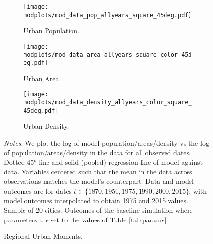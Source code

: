 \documentclass[./20250130-paper.tex]{subfiles}
\begin{document}
\begin{figure}[H]
	\begin{adjustbox}{center}
		\begin{subfigure}{\pthree\textwidth}
			\texttt{[image: \\modplots/mod\_data\_pop\_allyears\_square\_45deg.pdf]}
			\caption{Urban Population.\label{fig:model-data-Lu}}
		\end{subfigure}
		\begin{subfigure}{\pthree\textwidth}
			\texttt{[image: \\modplots/mod\_data\_area\_allyears\_square\_color\_45deg.pdf]}
			\caption{Urban Area.\label{fig:model-data-area}}
		\end{subfigure}
		\begin{subfigure}{\pthree\textwidth}
			\texttt{[image: \\modplots/mod\_data\_density\_allyears\_color\_square\_45deg.pdf]}
			\caption{Urban Density.\label{fig:model-data-density}}
		\end{subfigure}
	\end{adjustbox}
	\caption{Regional Urban Moments.\label{fig:model-data}}
	
	{\footnotesize \textit{Notes}: We plot the log of model population/areas/density vs the log of population/areas/density in the data for all observed dates. Dotted 45° line and solid (pooled) regression line of model against data. Variables centered such that the mean in the data across observations matches the model's counterpart. Data and model outcomes are for dates $t \in \{1870, 1950, 1975, 1990, 2000, 2015 \}$, with model outcomes interpolated to obtain 1975 and 2015 values. Sample of 20 cities. Outcomes of the baseline simulation where parameters are set to the values of Table \ref{tab:params}.}
\end{figure}
\end{document}
